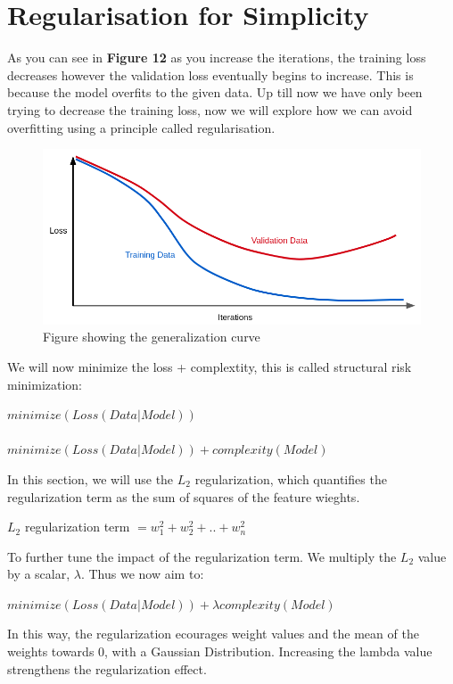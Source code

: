 \documentclass[12pt]{article}
\begin{document}
\section{Regularisation for Simplicity}
As you can see in \textbf{Figure 12} as you increase the iterations, the training loss decreases however the validation loss eventually begins to increase. This is because the model overfits to the given data. Up till now we have only been trying to decrease the training loss, now we will explore how we can avoid overfitting using a principle called regularisation.
\begin{figure}[H]
	\includegraphics[scale = 0.5]{imgs/GeneralizationCurve.png}
	\centering
	\caption{Figure showing the generalization curve}
\end{figure}
We will now minimize the loss + complextity, this is called structural risk minimization:
\begin{center}
$minimize(Loss(Data|Model))$\\ \textrightarrow \\$minimize(Loss(Data|Model)) + complexity(Model)$
\end{center}
In this section, we will use the $L_2$ regularization, which quantifies the regularization term as the sum of squares of the feature wieghts.
\begin{center}
$L_2$ regularization term $= w^2_1 + w^2_2 + .. + w^2_n$
\end{center}
To further tune the impact of the regularization term. We multiply the $L_2$ value by a scalar, $\lambda$. Thus we now aim to: 
\begin{center}
$minimize(Loss(Data|Model)) + \lambda complexity(Model)$
\end{center}
In this way, the regularization ecourages weight values and the mean of the weights towards 0, with a Gaussian Distribution. Increasing the lambda value strengthens the regularization effect.
\end{document}
